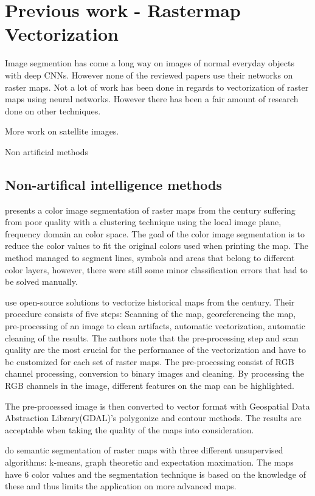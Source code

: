 \chapter{Previous work - Rastermap Vectorization}
Image segmention has come a long way on images of normal everyday objects with deep CNNs. However none of the reviewed papers use their networks on raster maps. Not a lot of work has been done in regards to vectorization of raster maps using neural networks. However there has been a fair amount of research done on other techniques.

More work on satellite images.

Non artificial methods 

\section{Non-artifical intelligence methods}

\citeauthor{Leyk2010}\cite{Leyk2010} presents a color image segmentation of raster maps from the  century suffering from poor quality with a clustering technique using the local image plane, frequency domain an color space. The goal of the color image segmentation is to reduce the color values to fit the original colors used when printing the map. The method managed to segment lines, symbols and areas that belong to different color layers, however, there were still some minor classification errors that had to be solved manually.

\citeauthor{Iosifescu2016}\cite{Iosifescu2016} use open-source solutions to vectorize historical maps from the  century. Their procedure consists of five steps: Scanning of the map, georeferencing the map, pre-processing of an image to clean artifacts, automatic vectorization, automatic cleaning of the results. The authors note that the pre-processing step and scan quality are the most crucial for the performance of the vectorization and have to be customized for each set of raster maps. The pre-processing consist of RGB channel processing, conversion to binary images and cleaning. By processing the RGB channels in the image, different features on the map can be highlighted.

The pre-processed image is then converted to vector format with Geospatial Data Abstraction Library\cite{OSGeo}(GDAL)'s polygonize and contour methods. The results are acceptable when taking the quality of the maps into consideration.

\citeauthor{Henderson}\cite{Henderson} do semantic segmentation of raster maps with three different unsupervised algorithms: k-means, graph theoretic and expectation maximation. The maps have 6 color values and the segmentation technique is based on the knowledge of these and thus limits the application on more advanced maps. 

